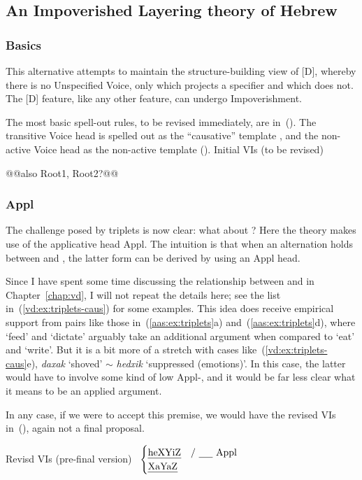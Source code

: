 	\subsection{An Impoverished Layering theory of Hebrew} \label{aas:jim:pros}
		\subsubsection{Basics}
This alternative attempts to maintain the structure-building view of [D], whereby there is no Unspecified Voice, only {\vds} which projects a specifier and {\vzs} which does not. The [D] feature, like any other feature, can undergo Impoverishment.

The most basic spell-out rules, to be revised immediately, are in~(\nextx). The transitive Voice head is spelled out as the ``causative'' template {\thif}, and the non-active Voice head as the non-active template (\tnif).
\pex Initial VIs (to be revised)
	\a {\vds} \lra~{\thif}
	\a {\vzs} \lra~{\tnif}
\xe

@@also Root1, Root2?@@

		\subsubsection{Appl}
The challenge posed by triplets is now clear: what about {\tkal}? Here the theory makes use of the applicative head Appl. The intuition is that when an alternation holds between {\tkal} and {\thif}, the latter form can be derived by using an Appl head.

Since I have spent some time discussing the relationship between {\tkal} and {\thif} in Chapter~\ref{chap:vd}, I will not repeat the details here; see the list in~(\ref{vd:ex:triplets-caus}) for some examples. This idea does receive empirical support from pairs like those in~(\ref{aas:ex:triplets}a) and~(\ref{aas:ex:triplets}d), where `feed' and `dictate' arguably take an additional argument when compared to `eat' and `write'. But it is a bit more of a stretch with cases like~(\ref{vd:ex:triplets-caus}e), \emph{daxak} `shoved' $\sim$ \emph{hedxik} `suppressed (emotions)'. In this case, the latter would have to involve some kind of low Appl-, and it would be far less clear what it means to be an applied argument.

In any case, if we were to accept this premise, we would have the revised VIs in~(\nextx), again not a final proposal.

\pex Revisd VIs (pre-final version)
	\a {\vds} \lra~$\begin{cases}
		\text{\thif} & \text{/ \trace~Appl}\\
		\text{\tkal} & \\
		\end{cases}$
	\a {\vzs} \lra~{\tnif}
\xe


